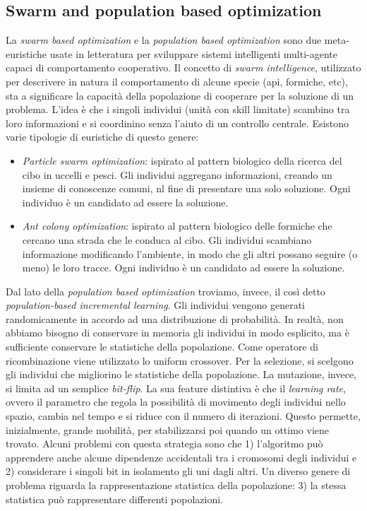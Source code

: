 \documentclass[10pt,a4paper]{article}
\begin{document}
\subsection{Swarm and population based optimization}

La \emph{swarm based optimization} e la \emph{population based optimization} sono due meta-euristiche usate in letteratura per sviluppare sistemi intelligenti multi-agente capaci di  comportamento cooperativo. Il concetto di \emph{swarm intelligence}, utilizzato per descrivere in natura il comportamento di alcune specie (api, formiche, etc), sta a significare la capacità della popolazione di cooperare per la soluzione di un problema. L'idea è che i singoli individui (unità con skill limitate) scambino tra loro informazioni e si coordinino senza l'aiuto di un controllo centrale. Esistono varie tipologie di euristiche di questo genere:

\begin{itemize}
\item{\emph{Particle swarm optimization}: ispirato al pattern biologico della ricerca del cibo in uccelli e pesci. Gli individui aggregano informazioni, creando un insieme di conoscenze comuni, nl fine di presentare una solo soluzione. Ogni individuo è un candidato ad essere la soluzione.}
\item{\emph{Ant colony optimization}: ispirato al pattern biologico delle formiche che cercano una strada che le conduca al cibo. Gli individui scambiano informazione modificando l'ambiente, in modo che gli altri possano seguire (o meno) le loro tracce. Ogni individuo è un candidato ad essere la soluzione.}
\end{itemize}

Dal lato della \emph{population based optimization} troviamo, invece, il così detto \emph{population-based incremental learning}. Gli individui vengono generati randomicamente in accordo ad una distribuzione di probabilità. In realtà, non abbiamo bisogno di conservare in memoria gli individui in modo esplicito, ma è sufficiente conservare le statistiche della popolazione. Come operatore di ricombinazione viene utilizzato lo uniform crossover. Per la selezione, si scelgono gli individui che migliorino le statistiche della popolazione. La mutazione, invece, si limita ad un semplice \emph{bit-flip}. La sua feature distintiva è che il \emph{learning rate}, ovvero il parametro che regola la possibilità di movimento degli individui nello spazio, cambia nel tempo e si riduce con il numero di iterazioni. Questo permette, inizialmente, grande mobilità, per stabilizzarsi poi quando un ottimo viene trovato. Alcuni problemi con questa strategia sono che 1) l'algoritmo può apprendere anche alcune dipendenze accidentali tra i cromosomi degli individui e 2) considerare i singoli bit in isolamento gli uni dagli altri. Un diverso genere di problema riguarda la rappresentazione statistica della popolazione: 3) la stessa statistica può rappresentare differenti popolazioni.
\end{document}
